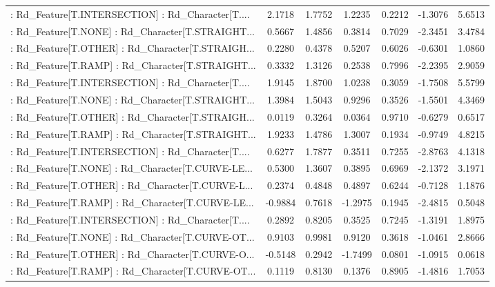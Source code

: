 \begin{longtable}{p{4cm}cccccc}
 : Rd\_Feature[T.INTERSECTION] : Rd\_Character[T.... &  2.1718 &    1.7752 &  1.2235 &       0.2212 & -1.3076 &  5.6513 \\
 : Rd\_Feature[T.NONE] : Rd\_Character[T.STRAIGHT... &  0.5667 &    1.4856 &  0.3814 &       0.7029 & -2.3451 &  3.4784 \\
 : Rd\_Feature[T.OTHER] : Rd\_Character[T.STRAIGH... &  0.2280 &    0.4378 &  0.5207 &       0.6026 & -0.6301 &  1.0860 \\
 : Rd\_Feature[T.RAMP] : Rd\_Character[T.STRAIGHT... &  0.3332 &    1.3126 &  0.2538 &       0.7996 & -2.2395 &  2.9059 \\
 : Rd\_Feature[T.INTERSECTION] : Rd\_Character[T.... &  1.9145 &    1.8700 &  1.0238 &       0.3059 & -1.7508 &  5.5799 \\
 : Rd\_Feature[T.NONE] : Rd\_Character[T.STRAIGHT... &  1.3984 &    1.5043 &  0.9296 &       0.3526 & -1.5501 &  4.3469 \\
 : Rd\_Feature[T.OTHER] : Rd\_Character[T.STRAIGH... &  0.0119 &    0.3264 &  0.0364 &       0.9710 & -0.6279 &  0.6517 \\
 : Rd\_Feature[T.RAMP] : Rd\_Character[T.STRAIGHT... &  1.9233 &    1.4786 &  1.3007 &       0.1934 & -0.9749 &  4.8215 \\
 : Rd\_Feature[T.INTERSECTION] : Rd\_Character[T.... &  0.6277 &    1.7877 &  0.3511 &       0.7255 & -2.8763 &  4.1318 \\
 : Rd\_Feature[T.NONE] : Rd\_Character[T.CURVE-LE... &  0.5300 &    1.3607 &  0.3895 &       0.6969 & -2.1372 &  3.1971 \\
 : Rd\_Feature[T.OTHER] : Rd\_Character[T.CURVE-L... &  0.2374 &    0.4848 &  0.4897 &       0.6244 & -0.7128 &  1.1876 \\
 : Rd\_Feature[T.RAMP] : Rd\_Character[T.CURVE-LE... & -0.9884 &    0.7618 & -1.2975 &       0.1945 & -2.4815 &  0.5048 \\
 : Rd\_Feature[T.INTERSECTION] : Rd\_Character[T.... &  0.2892 &    0.8205 &  0.3525 &       0.7245 & -1.3191 &  1.8975 \\
 : Rd\_Feature[T.NONE] : Rd\_Character[T.CURVE-OT... &  0.9103 &    0.9981 &  0.9120 &       0.3618 & -1.0461 &  2.8666 \\
 : Rd\_Feature[T.OTHER] : Rd\_Character[T.CURVE-O... & -0.5148 &    0.2942 & -1.7499 &       0.0801 & -1.0915 &  0.0618 \\
 : Rd\_Feature[T.RAMP] : Rd\_Character[T.CURVE-OT... &  0.1119 &    0.8130 &  0.1376 &       0.8905 & -1.4816 &  1.7053 \\

\end{longtable}
